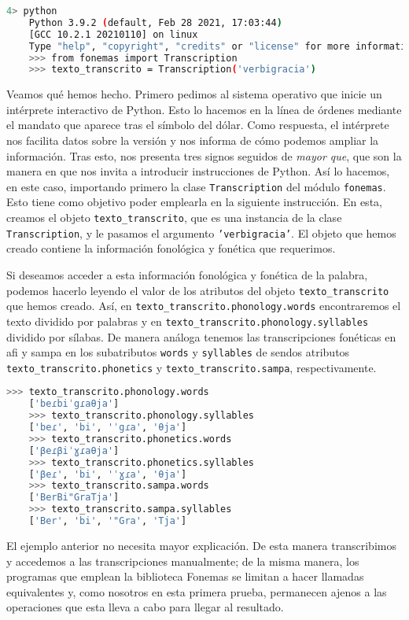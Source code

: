 \begin{lstlisting}[numbers=none, frame=none, keywordstyle=\ttfamily,  language=bash]
	4> python
	Python 3.9.2 (default, Feb 28 2021, 17:03:44) 
	[GCC 10.2.1 20210110] on linux
	Type "help", "copyright", "credits" or "license" for more information.
	>>> from fonemas import Transcription
	>>> texto_transcrito = Transcription('verbigracia')
\end{lstlisting}
Veamos qué hemos hecho. Primero pedimos al sistema operativo que inicie un intérprete interactivo de Python. Esto lo hacemos en la línea de órdenes mediante el mandato que aparece tras el símbolo del dólar. Como respuesta, el intérprete nos facilita datos sobre la versión y nos informa de cómo podemos ampliar la información. Tras esto, nos presenta tres signos seguidos de \textit{mayor que}, que son la manera en que nos invita a introducir instrucciones de Python. Así lo hacemos, en este caso, importando primero la clase \texttt{Transcription} del módulo \texttt{fonemas}. Esto tiene como objetivo poder emplearla en la siguiente instrucción. En esta, creamos el objeto \texttt{texto\_transcrito}, que es una instancia de la clase \texttt{Transcription}, y le pasamos el argumento \texttt{'verbigracia'}. El objeto que hemos creado contiene la información fonológica y fonética que requerimos. 

Si deseamos  acceder a esta información fonológica y fonética de la palabra, podemos hacerlo leyendo el valor de los atributos del objeto \texttt{texto\_transcrito} que hemos creado. Así, en \texttt{texto\_transcrito.phonology.words} encontraremos el texto dividido por palabras y en \texttt{texto\_transcrito.phonology.syllables} dividido por sílabas. De manera análoga tenemos las transcripciones fonéticas en \ac{afi} y \ac{sampa} en los subatributos \texttt{words} y \texttt{syllables} de sendos atributos \texttt{texto\_transcrito.phonetics} y \texttt{texto\_transcrito.sampa}, respectivamente.
\begin{lstlisting}[numbers=none, frame=none, keywordstyle=\ttfamily,  language=bash]
	>>> texto_transcrito.phonology.words
	['beɾbiˈgɾaθja']
	>>> texto_transcrito.phonology.syllables
	['beɾ', 'bi', 'ˈgɾa', 'θja']
	>>> texto_transcrito.phonetics.words
	['βeɾβiˈɣɾaθja']
	>>> texto_transcrito.phonetics.syllables
	['βeɾ', 'bi', 'ˈɣɾa', 'θja']
	>>> texto_transcrito.sampa.words
	['BerBi"GraTja']
	>>> texto_transcrito.sampa.syllables
	['Ber', 'bi', '"Gra', 'Tja']
\end{lstlisting}
El ejemplo anterior no necesita mayor explicación. De esta manera transcribimos y accedemos a las transcripciones manualmente; de la misma manera, los programas que emplean la biblioteca Fonemas se limitan a hacer llamadas equivalentes y, como nosotros en esta primera prueba, permanecen ajenos a las operaciones que esta lleva a cabo para llegar al resultado.

